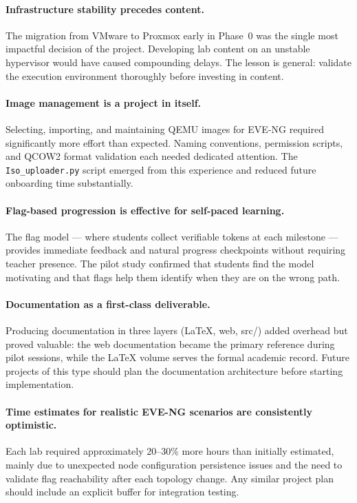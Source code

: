 \paragraph{Infrastructure stability precedes content.}
The migration from VMware to Proxmox early in Phase~0 was the single most impactful
decision of the project. Developing lab content on an unstable hypervisor
would have caused compounding delays. The lesson is general: validate the
execution environment thoroughly before investing in content.

\paragraph{Image management is a project in itself.}
Selecting, importing, and maintaining QEMU images for EVE-NG required significantly
more effort than expected. Naming conventions, permission scripts, and QCOW2
format validation each needed dedicated attention. The \texttt{Iso\_uploader.py}
script emerged from this experience and reduced future onboarding time substantially.

\paragraph{Flag-based progression is effective for self-paced learning.}
The flag model --- where students collect verifiable tokens at each milestone ---
provides immediate feedback and natural progress checkpoints without requiring
teacher presence. The pilot study confirmed that students find the
model motivating and that flags help them identify when they are on the wrong path.

\paragraph{Documentation as a first-class deliverable.}
Producing documentation in three layers (LaTeX, web, src/) added overhead
but proved valuable: the web documentation became the primary reference during
pilot sessions, while the LaTeX volume serves the formal academic record.
Future projects of this type should plan the documentation architecture before
starting implementation.

\paragraph{Time estimates for realistic EVE-NG scenarios are consistently optimistic.}
Each lab required approximately 20--30\% more hours than initially estimated,
mainly due to unexpected node configuration persistence issues and the need to
validate flag reachability after each topology change. Any similar project plan
should include an explicit buffer for integration testing.

